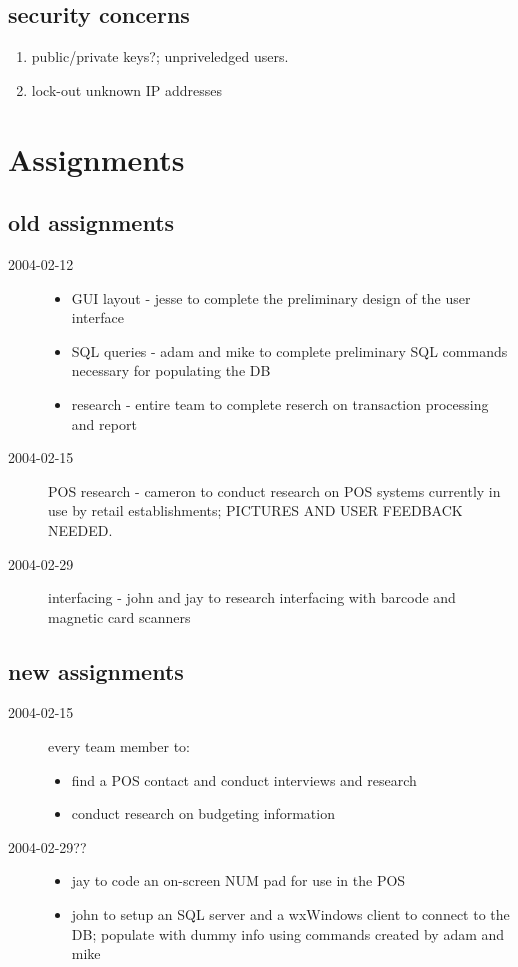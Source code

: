 \documentclass{article}
\begin{document}
\subsection{security concerns}
\begin{enumerate}
    \item public/private keys?; unpriveledged users.
    \item lock-out unknown IP addresses
\end{enumerate}

\section{Assignments}
\subsection{old assignments}
\begin{description}
    \item[2004-02-12]
    \begin{itemize}
        \item GUI layout - jesse to complete the preliminary design of the user interface
        \item SQL queries - adam and mike to complete preliminary SQL commands necessary for populating the DB
        \item research - entire team to complete reserch on transaction processing and report
    \end{itemize}
    \item[2004-02-15] POS research - cameron to conduct research on POS systems currently in use by retail establishments; PICTURES AND USER FEEDBACK NEEDED.
    \item[2004-02-29] interfacing - john and jay to research interfacing with barcode and magnetic card scanners
\end{description}

\subsection{new assignments}
\begin{description}
    \item[2004-02-15] every team member to:
    \begin{itemize}
        \item find a POS contact and conduct interviews and research
        \item conduct research on budgeting information
    \end{itemize}
    \item[2004-02-29??]
    \begin{itemize}
        \item jay to code an on-screen NUM pad for use in the POS
        \item john to setup an SQL server and a wxWindows client to connect to the DB; populate with dummy info using commands created by adam and mike
    \end{itemize}
\end{description}
\end{document}
